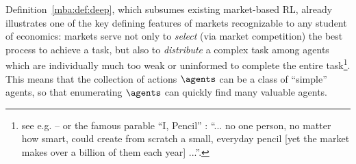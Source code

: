 




Definition~\ref{mba:def:deep}, which subsumes existing market-based RL, already illustrates one of the key defining features of markets recognizable to any student of economics: markets serve not only to \emph{select} (via market competition) the best process to achieve a task, but also to \emph{distribute} a complex task among agents which are individually much too weak or uninformed to complete the entire task\footnote{see e.g. \citet{hayekEconomicsKnowledge1937} -- or the famous parable ``I, Pencil'' \citep{leonardereadPencilMyFamily1958}: ``... no one person, no matter how smart, could create from scratch a small, everyday pencil [yet the market makes over a billion of them each year] ...''.}. This means that the collection of actions $\agents$ can be a class of ``simple'' agents, so that enumerating $\agents$ can quickly find many valuable agents.

